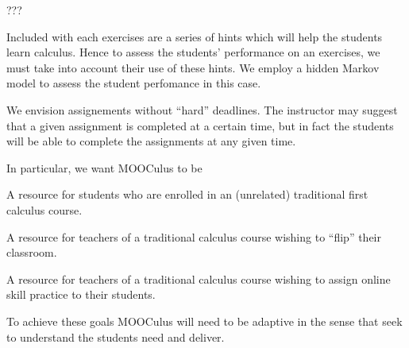 
???



Included with each exercises are a series of hints which will help the
students learn calculus.  Hence to assess the students' performance on
an exercises, we must take into account their use of these hints. We
employ a hidden Markov model to assess the student perfomance in this
case.



We envision assignements without ``hard'' deadlines. The instructor
may suggest that a given assignment is completed at a certain time,
but in fact the students will be able to complete the assignments at
any given time.




 In particular, we want
MOOCulus to be

A resource for students who are enrolled in an (unrelated) traditional first
calculus course.

A resource for teachers of a traditional calculus course wishing to ``flip''
their classroom.

A resource for teachers of a traditional calculus course wishing to assign
online skill practice to their students.

To achieve these goals MOOCulus will need to be adaptive in the sense that
seek to understand the students need and deliver.










